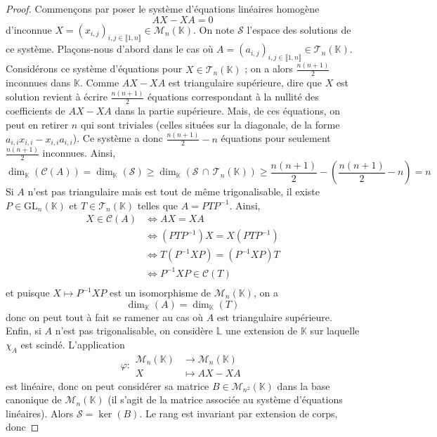 	\begin{proof}
		Commençons par poser le système d'équations linéaires homogène
		\[ AX - XA = 0 \]
		d'inconnue $X = (x_{i,j})_{i,j \in \llbracket 1, n \rrbracket} \in \mathcal{M}_n(\mathbb{K})$. On note $\mathcal{S}$ l'espace des solutions de ce système.
		\newpar
		Plaçons-nous d'abord dans le cas où $A = (a_{i,j})_{i,j \in \llbracket 1, n \rrbracket} \in \mathcal{T}_n(\mathbb{K})$. Considérons ce système d'équations pour $X \in \mathcal{T}_n(\mathbb{K})$ ; on a alors $\frac{n(n+1)}{2}$ inconnues dans $\mathbb{K}$. Comme $AX-XA$ est triangulaire supérieure, dire que $X$ est solution revient à écrire $\frac{n(n+1)}{2}$ équations correspondant à la nullité des coefficients de $AX - XA$ dans la partie supérieure. Mais, de ces équations, on peut en retirer $n$ qui sont triviales (celles situées sur la diagonale, de la forme $a_{i,i} x_{i,i} - x_{i,i} a_{i,i}$). Ce système a donc $\frac{n(n+1)}{2} - n$ équations pour seulement $\frac{n(n+1)}{2}$ inconnues. Ainsi,
		\[ \dim_{\mathbb{K}}(\mathcal{C}(A)) = \dim_{\mathbb{K}}(\mathcal{S}) \geq \dim_{\mathbb{K}}(\mathcal{S} \, \cap \, \mathcal{T}_n(\mathbb{K})) \geq \frac{n(n+1)}{2} - \left( \frac{n(n+1)}{2} - n \right) = n \]
		Si $A$ n'est pas triangulaire mais est tout de même trigonalisable, il existe $P \in \mathrm{GL}_n(\mathbb{K})$ et $T \in \mathcal{T}_n(\mathbb{K})$ telles que $A = PTP^{-1}$. Ainsi,
		\begin{align*}
			X \in \mathcal{C}(A) &\iff AX = XA \\
			&\iff (PTP^{-1}) X = X (PTP^{-1}) \\
			&\iff T (P^{-1}XP) = (P^{-1}XP) T \\
			&\iff P^{-1}XP \in \mathcal{C}(T) \\
		\end{align*}
		et puisque $X \mapsto P^{-1}XP$ est un isomorphisme de $\mathcal{M}_n(\mathbb{K})$, on a
		\[ \dim_{\mathbb{K}}(A) = \dim_{\mathbb{K}}(T) \]
		donc on peut tout à fait se ramener au cas où $A$ est triangulaire supérieure.
		\newpar
		Enfin, si $A$ n'est pas trigonalisable, on considère $\mathbb{L}$ une extension de $\mathbb{K}$ sur laquelle $\chi_A$ est scindé. L'application
		\[ \varphi :
		\begin{array}{cl}
			\mathcal{M}_n(\mathbb{K}) &\rightarrow \mathcal{M}_n(\mathbb{K}) \\
			X &\mapsto AX-XA
		\end{array}
		\]
		est linéaire, donc on peut considérer sa matrice $B \in \mathcal{M}_{n^2}(\mathbb{K})$ dans la base canonique de $\mathcal{M}_n(\mathbb{K})$ (il s'agit de la matrice associée au système d'équations linéaires). Alors $\mathcal{S} = \ker(B)$. Le rang est invariant par extension de corps, donc

\end{proof}
